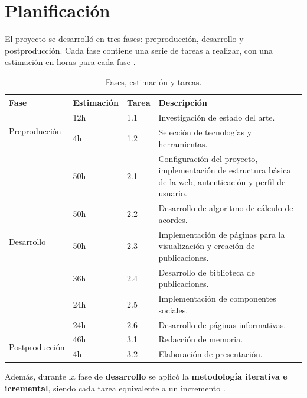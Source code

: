 \section{Planificación}

El proyecto se desarrolló en tres fases: preproducción, desarrollo y postproducción. Cada fase contiene una serie de tareas a realizar, con una estimación en horas para cada fase .

\begin{table}[H]
    \caption{Fases, estimación y tareas.}\label{tab:fases_tareas}
    \scriptsize
    \centering
    \begin{tabular}{lllp{}}
        \hline

        \textbf{Fase} & \textbf{Estimación} & \textbf{Tarea} & \textbf{Descripción} \\ \hline
        
        \multirow{2}{*}{Preproducción} 
        & 12h & 1.1 & Investigación de estado del arte. \\ 
        & 4h & 1.2 & Selección de tecnologías y herramientas. \\ \hline
        
        \multirow{6}{*}{Desarrollo} 
        & 50h & 2.1 & Configuración del proyecto, implementación de estructura básica de la web, autenticación y perfil de usuario. \\ 
        & 50h & 2.2 & Desarrollo de algoritmo de cálculo de acordes. \\ 
        & 50h & 2.3 & Implementación de páginas para la visualización y creación de publicaciones. \\ 
        & 36h & 2.4 & Desarrollo de biblioteca de publicaciones. \\ 
        & 24h & 2.5 & Implementación de componentes sociales. \\ 
        & 24h & 2.6 & Desarrollo de páginas informativas. \\ \hline
        
        \multirow{2}{*}{Postproducción} 
        & 46h & 3.1 & Redacción de memoria. \\ 
        & 4h & 3.2 & Elaboración de presentación. \\ \hline
        
    \end{tabular}
\end{table}

Además, durante la fase de \textbf{desarrollo} se aplicó la \textbf{metodología iterativa e icremental}, siendo cada tarea equivalente a un incremento .

